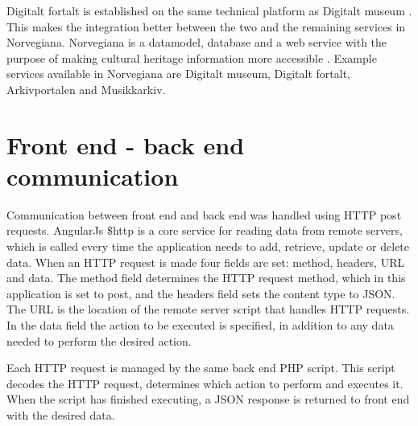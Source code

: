 Digitalt fortalt is established on the same technical platform as Digitalt museum \cite{HM2}. This makes the integration better between the two and the remaining services in Norvegiana. Norvegiana is a datamodel, database and a web service with the purpose of making cultural heritage information more accessible \cite{HM3}. Example services available in Norvegiana are Digitalt museum, Digitalt fortalt, Arkivportalen and Musikkarkiv. 

\section{Front end - back end communication}
\label{subsec:frontend-backend_communication}

Communication between front end and back end was handled using HTTP post requests.
AngularJs \$http is a core service for reading data from remote servers, which is called every time the application needs to add, retrieve, update or delete data. When an HTTP request is made four fields are set: method, headers, URL and data. The method field determines the HTTP request method, which in this application is set to post, and the headers field sets the content type to JSON. The URL is the location of the remote server script that handles HTTP requests. In the data field the action to be executed is specified, in addition to any data needed to perform the desired action.\newline

Each HTTP request is managed by the same back end PHP script. This script decodes the HTTP request, determines which action to perform and executes it. When the script has finished executing, a JSON response is returned to front end with the desired data.

\cleardoublepage